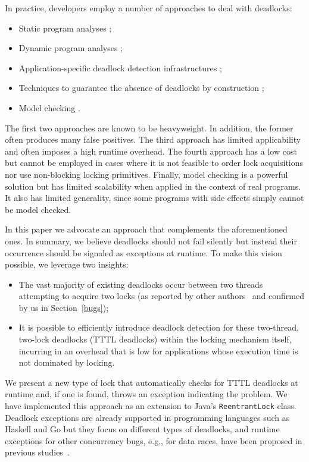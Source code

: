 In practice, developers employ a number of approaches to deal with deadlocks:
\begin{itemize}
\item Static program analyses \cite{marino}\cite{dawson}\cite{vivek}\cite{williams};
\item Dynamic program analyses \cite{mcsdk}\cite{magicfuzzer}\cite{sammati}\cite{serenity}\cite{pyla}\cite{rx};
\item Application-specific deadlock detection infrastructu\-res \cite{orderedlock};
\item Techniques to guarantee the absence of deadlocks by construction \cite{marino};
\item Model checking \cite{havelund}.
\end{itemize}
The first two approaches are known to be heavyweight. In addition, the former often produces many false positives.
The third approach has limited applicability and often imposes a high runtime overhead.
The fourth approach has a low cost but cannot be employed in cases where it is not feasible to order lock acquisitions nor use non-blocking locking primitives.
Finally, model checking is a powerful solution but has limited scalability when applied in the context of real programs. It also has limited generality, since some programs with side effects simply cannot be model checked.

In this paper we advocate an approach that complements the aforementioned ones.
In summary, we believe deadlocks should not fail silently but instead their occurrence should be signaled as exceptions at runtime.
To make this vision possible, we leverage two insights:
\begin{itemize}
\item The vast majority of existing deadlocks occur between two threads attempting to acquire two locks (as reported by other authors~\cite{lu} and confirmed by us in Section~\ref{bugs});
\item It is possible to efficiently introduce deadlock detection for these two-thread, two-lock deadlocks (TTTL deadlocks) within the locking mechanism itself, incurring in an overhead that is low for applications whose execution time is not dominated by locking.
\end{itemize}
We present a new type of lock that automatically checks for TTTL deadlocks at runtime and, if one is found, throws an exception indicating the problem.
We have implemented this approach as an extension to Java's {\tt ReentrantLock} class.
Deadlock exceptions are already supported in programming languages such as Haskell \cite{marlow} and Go \cite{golang} but they focus on different types of deadlocks, and runtime exceptions for other concurrency bugs, e.g., for data races, have been proposed in previous studies~\cite{valor}.

